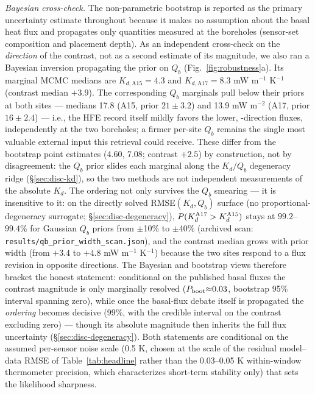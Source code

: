 \documentclass[11pt]{article}
\begin{document}
\emph{Bayesian cross-check.} The non-parametric bootstrap is reported as
the primary uncertainty estimate throughout because it makes no assumption
about the basal heat flux and propagates only quantities measured at the
boreholes (sensor-set composition and placement depth). As an independent
cross-check on the \emph{direction} of the contrast, not as a second
estimate of its magnitude, we also ran a Bayesian inversion propagating the
\citet{saito2007,nagihara2018} prior on $Q_b$
(Fig.~\ref{fig:robustness}a). Its marginal MCMC medians
are $K_{d,\mathrm{A15}}=4.3$ and
$K_{d,\mathrm{A17}}=8.3$
mW m$^{-1}$ K$^{-1}$ (contrast median $+3.9$).
The corresponding $Q_b$ marginals pull below their priors at both
sites --- medians 17.8 (A15, prior $21\pm3.2$) and 13.9 mW m$^{-2}$
(A17, prior $16\pm2.4$) --- i.e., the HFE record itself mildly favors
the lower, \citet{saito2007}-direction fluxes, independently at the two
boreholes; a firmer per-site $Q_b$ remains the single most valuable
external input this retrieval could receive. These
differ from the
bootstrap point estimates (4.60,
7.08; contrast $+2.5$) by construction,
not by disagreement: the $Q_b$ prior slides each marginal along the
$K_d/Q_b$ degeneracy ridge (\S\ref{sec:disc-kd}), so the two methods are
not independent measurements of the absolute $K_d$. The ordering not only survives
the $Q_b$ smearing --- it is insensitive to it: on the directly solved
RMSE$(K_d,Q_b)$ surface (no proportional-degeneracy surrogate;
\S\ref{sec:disc-degeneracy}), $P(K_d^{\rm A17}>K_d^{\rm A15})$ stays at
$99.2$--$99.4\%$ for Gaussian $Q_b$ priors from $\pm$10\% to
$\pm$40\% (archived scan: \texttt{results/qb\_prior\_width\_scan.json}),
and the contrast median grows with prior width (from
$+3.4$ to $+4.8$ mW m$^{-1}$ K$^{-1}$) because the two sites respond to a
flux revision in opposite directions. The Bayesian and bootstrap views
therefore bracket the honest statement: conditional on the published
basal fluxes the contrast magnitude is only marginally resolved
($P_{\rm boot}{\approx}0.03$, bootstrap 95\% interval spanning zero), while once the
basal-flux debate itself is propagated the \emph{ordering} becomes
decisive (99\%, with the credible interval on the contrast excluding
zero) --- though its absolute magnitude then inherits the full flux
uncertainty (\S\ref{sec:disc-degeneracy}). Both statements are
conditional on the assumed per-sensor noise scale (0.5 K, chosen at the
scale of the residual model--data RMSE of Table~\ref{tab:headline}
rather than the 0.03--0.05 K within-window thermometer precision, which
characterizes short-term stability only) that sets the
likelihood sharpness.%
\end{document}

